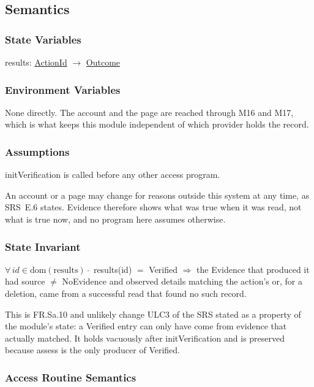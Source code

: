 \documentclass[12pt, titlepage]{article}
\begin{document}
\subsection{Semantics}

\subsubsection{State Variables}

results: \hyperref[type:ActionId]{ActionId} $\to$
\hyperref[type:Outcome]{Outcome}

\subsubsection{Environment Variables}

None directly. The account and the page are reached through M16 and M17, which
is what keeps this module independent of which provider holds the record.

\subsubsection{Assumptions}

initVerification is called before any other access program.

\noindent An account or a page may change for reasons outside this system at any
time, as SRS~E.6 states. Evidence therefore shows what was true when it was
read, not what is true now, and no program here assumes otherwise.

\subsubsection{State Invariant}

$\forall\, id \in \mathrm{dom}(\text{results}) \cdot$ results(id) $=$ Verified
$\Rightarrow$ the Evidence that produced it had source $\neq$ NoEvidence and
observed details matching the action's or, for a deletion, came from a
successful read that found no such record.

\noindent This is FR.Sa.10 and unlikely change ULC3 of the SRS stated as a
property of the module's state: a Verified entry can only have come from
evidence that actually matched. It holds vacuously after initVerification and is
preserved because assess is the only producer of Verified.

\subsubsection{Access Routine Semantics}
\end{document}
